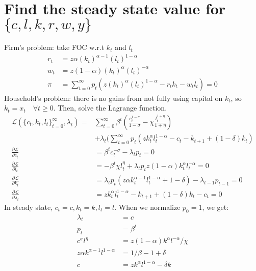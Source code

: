\documentclass{article}
\begin{document}
\section{Find the steady state value for $\{c,l,k,r,w,y\}$}
Firm's problem: take FOC w.r.t $k_{t}$ and $l_{t}$
    \begin{equation}
    \begin{split}
    r_{t} &= z\alpha (k_{t})^{\alpha-1}(l_{t})^{1-\alpha}\\
    w_{t} &= z(1-\alpha)(k_t)^{\alpha} (l_t)^{-\alpha}\\
    \pi &= \sum_{t=0}^{\infty} p_{t}(z(k_{t})^\alpha(l_{t})^{1-\alpha}-r_{t}k_{t}-w_{t}l_{t})=0
    \end{split}
    \end{equation}
Household's problem: there is no gains from not fully using capital on $k_t$, so $k_t = x_t \quad \forall t\geq0 $. Then, solve the Lagrange function.
    \begin{equation}
    \begin{split}
    \mathcal{L}(\{c_t,k_t,l_t\}_{t=0}^{\infty},\lambda_t)=&\sum_{t=0}^{\infty} \beta ^t(\frac{c_t^{1-\sigma}}{1-\sigma}-\chi \frac{l_t^{1+\eta}}{1+\eta})\\
    &+\lambda_t(\sum_{t=0}^{\infty}p_t(zk_t^{\alpha}l_t^{1-\alpha}-c_t-k_{t+1}+(1-\delta)k_t)\\
    \frac{\partial \mathcal{L}}{\partial c_t} &=\beta^tc_t^{-\sigma}-\lambda_t p_t=0\\
    \frac{\partial \mathcal{L}}{\partial l_t} &=-\beta^t\chi l_t^{\eta}+\lambda_t p_tz(1-\alpha) k_t^{\alpha}l_t^{-\alpha}=0\\
    \frac{\partial \mathcal{L}}{\partial k_t}&=\lambda_t p_t(z\alpha k_t^{\alpha -1}l_t^{1-\alpha}+1-\delta)-\lambda_{t-1}p_{t-1}=0\\
    \frac{\partial \mathcal{L}}{\partial \lambda_t} &= zk_t^{\alpha}l_t^{1-\alpha}-k_{t+1}+(1-\delta)k_t - c_t = 0
    \end{split}
    \end{equation}
 In steady state, $c_t =c, k_t =k, l_t =l$. When we normalize $p_0 =1$, we get:
 \begin{equation}
    \begin{split}
    \lambda_t &= c\\
    p_t &= \beta^t\\
    c^{\sigma} l^{\eta}&= z(1-\alpha)k^{\alpha}l^{-\alpha}/\chi\\
    z\alpha k^{\alpha -1}l^{1-\alpha}&= 1/\beta -1 +\delta\\
    c&=zk^{\alpha}l^{1-\alpha}-\delta k
    \end{split}
    \end{equation}
\end{document}
